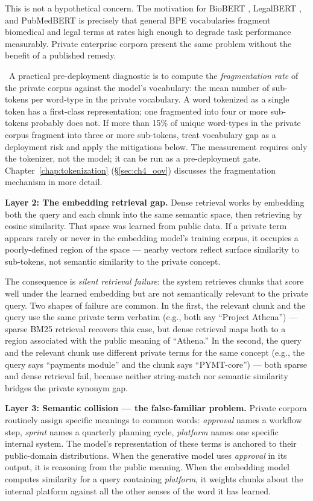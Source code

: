 This is not a hypothetical concern. The motivation for
BioBERT \citep{biobertlee2020}, LegalBERT
\citep{legalbert2020}, and PubMedBERT is precisely that general
BPE vocabularies fragment biomedical and legal terms at rates
high enough to degrade task performance measurably. Private
enterprise corpora present the same problem without the benefit
of a published remedy.

\Emp\ A practical pre-deployment diagnostic is to compute the
\emph{fragmentation rate} of the private corpus against the
model's vocabulary: the mean number of sub-tokens per
word-type in the private vocabulary. A word tokenized as a
single token has a first-class representation; one fragmented
into four or more sub-tokens probably does not. If more than
15\% of unique word-types in the private corpus fragment into
three or more sub-tokens, treat vocabulary gap as a deployment
risk and apply the mitigations below. The measurement requires
only the tokenizer, not the model; it can be run as a
pre-deployment gate. Chapter~\ref{chap:tokenization} (\S\ref{sec:ch4_oov}) discusses
the fragmentation mechanism in more detail.

\textbf{Layer 2: The embedding retrieval gap.}
Dense retrieval works by embedding both the query and each
chunk into the same semantic space, then retrieving by cosine
similarity. That space was learned from public data. If a
private term appears rarely or never in the embedding model's
training corpus, it occupies a poorly-defined region of the
space --- nearby vectors reflect surface similarity to
sub-tokens, not semantic similarity to the private concept.

The consequence is \emph{silent retrieval failure}: the system
retrieves chunks that score well under the learned embedding
but are not semantically relevant to the private query. Two
shapes of failure are common. In the first, the relevant
chunk and the query use the same private term verbatim (e.g.,
both say ``Project Athena'') --- sparse BM25 retrieval
recovers this case, but dense retrieval maps both to a region
associated with the public meaning of ``Athena.'' In the
second, the query and the relevant chunk use different private
terms for the same concept (e.g., the query says ``payments
module'' and the chunk says ``PYMT-core'') --- both sparse
and dense retrieval fail, because neither string-match nor
semantic similarity bridges the private synonym gap.

\textbf{Layer 3: Semantic collision --- the false-familiar problem.}
Private corpora routinely assign specific meanings to common
words: \emph{approval} names a workflow step, \emph{sprint}
names a quarterly planning cycle, \emph{platform} names one
specific internal system. The model's representation of these
terms is anchored to their public-domain distributions. When
the generative model uses \emph{approval} in its output, it is
reasoning from the public meaning. When the embedding model
computes similarity for a query containing \emph{platform}, it
weights chunks about the internal platform against all the
other senses of the word it has learned.

